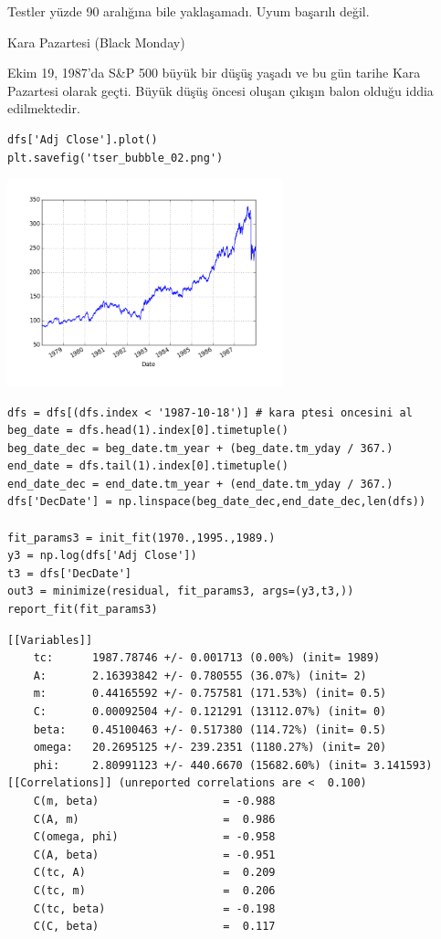 \documentclass[12pt,fleqn]{article}\usepackage{../../common}
\begin{document}
Testler yüzde 90 aralığına bile yaklaşamadı. Uyum başarılı değil.

Kara Pazartesi (Black Monday)

Ekim 19, 1987'da S\&P 500 büyük bir düşüş yaşadı ve bu gün tarihe Kara
Pazartesi olarak geçti. Büyük düşüş öncesi oluşan çıkışın balon olduğu
iddia edilmektedir.

\begin{verbatim}
dfs['Adj Close'].plot()
plt.savefig('tser_bubble_02.png')
\end{verbatim}

\includegraphics[height=6cm]{tser_bubble_02.png}

\begin{verbatim}
dfs = dfs[(dfs.index < '1987-10-18')] # kara ptesi oncesini al
beg_date = dfs.head(1).index[0].timetuple()
beg_date_dec = beg_date.tm_year + (beg_date.tm_yday / 367.)
end_date = dfs.tail(1).index[0].timetuple()
end_date_dec = end_date.tm_year + (end_date.tm_yday / 367.)
dfs['DecDate'] = np.linspace(beg_date_dec,end_date_dec,len(dfs))

fit_params3 = init_fit(1970.,1995.,1989.)
y3 = np.log(dfs['Adj Close'])
t3 = dfs['DecDate']
out3 = minimize(residual, fit_params3, args=(y3,t3,))
report_fit(fit_params3)
\end{verbatim}

\begin{verbatim}
[[Variables]]
    tc:      1987.78746 +/- 0.001713 (0.00%) (init= 1989)
    A:       2.16393842 +/- 0.780555 (36.07%) (init= 2)
    m:       0.44165592 +/- 0.757581 (171.53%) (init= 0.5)
    C:       0.00092504 +/- 0.121291 (13112.07%) (init= 0)
    beta:    0.45100463 +/- 0.517380 (114.72%) (init= 0.5)
    omega:   20.2695125 +/- 239.2351 (1180.27%) (init= 20)
    phi:     2.80991123 +/- 440.6670 (15682.60%) (init= 3.141593)
[[Correlations]] (unreported correlations are <  0.100)
    C(m, beta)                   = -0.988 
    C(A, m)                      =  0.986 
    C(omega, phi)                = -0.958 
    C(A, beta)                   = -0.951 
    C(tc, A)                     =  0.209 
    C(tc, m)                     =  0.206 
    C(tc, beta)                  = -0.198 
    C(C, beta)                   =  0.117 
\end{verbatim}
\end{document}
